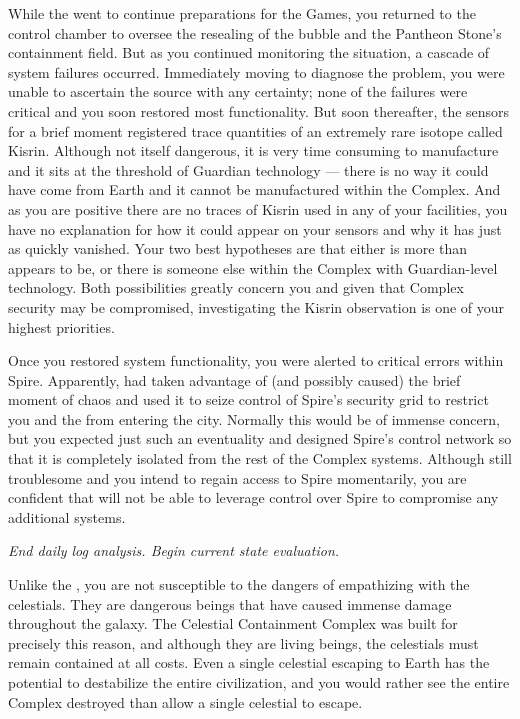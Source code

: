 \documentclass[char]{guardians}
\begin{document}
While the \cCaretaker{} went to continue preparations for the Games, you returned to the control chamber to oversee the resealing of the bubble and the Pantheon Stone's containment field. But as you continued monitoring the situation, a cascade of system failures occurred. Immediately moving to diagnose the problem, you were unable to ascertain the source with any certainty; none of the failures were critical and you soon restored most functionality. But soon thereafter, the sensors for a brief moment registered trace quantities of an extremely rare isotope called Kisrin. Although not itself dangerous, it is very time consuming to manufacture and it sits at the threshold of Guardian technology --- there is no way it could have come from Earth and it cannot be manufactured within the Complex. And as you are positive there are no traces of Kisrin used in any of your facilities, you have no explanation for how it could appear on your sensors and why it has just as quickly vanished. Your two best hypotheses are that either \cUnity{} is more than \cUnity{\they} appears to be, or there is someone else within the Complex with Guardian-level technology. Both possibilities greatly concern you and given that Complex security may be compromised, investigating the Kisrin observation is one of your highest priorities.

Once you restored system functionality, you were alerted to critical errors within Spire. Apparently, \cUnity{} had taken advantage of (and possibly caused) the brief moment of chaos and used it to seize control of Spire's security grid to restrict you and the \cCaretaker{} from entering the city. Normally this would be of immense concern, but you expected just such an eventuality and designed Spire's control network so that it is completely isolated from the rest of the Complex systems. Although still troublesome and you intend to regain access to Spire momentarily, you are confident that \cUnity{} will not be able to leverage \cUnity{\their} control over Spire to compromise any additional systems.


\emph{End daily log analysis. Begin current state evaluation.}

Unlike the \cCaretaker{}, you are not susceptible to the dangers of empathizing with the celestials. They are dangerous beings that have caused immense damage throughout the galaxy. The Celestial Containment Complex was built for precisely this reason, and although they are living beings, the celestials must remain contained at all costs. Even a single celestial escaping to Earth has the potential to destabilize the entire civilization, and you would rather see the entire Complex destroyed than allow a single celestial to escape.
\end{document}
